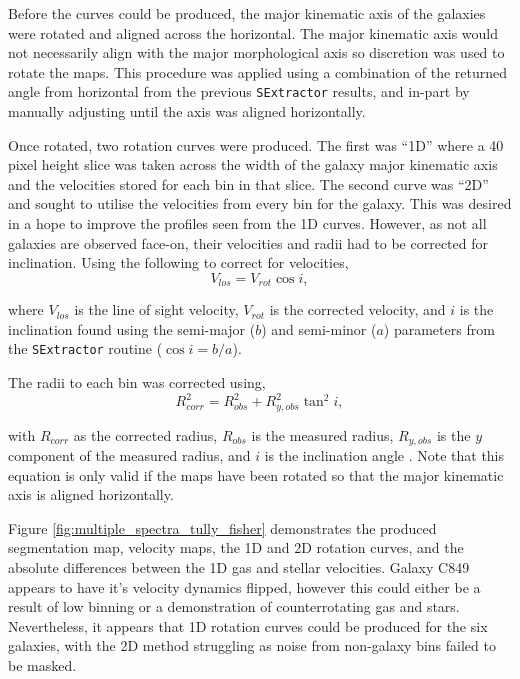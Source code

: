 \documentclass[12pt, twocolumn, nofootinbib]{revtex4-1}    %
\begin{document}
Before the curves could be produced, the major kinematic axis of the galaxies were rotated and aligned across the horizontal. The major kinematic axis would not necessarily align with the major morphological axis so discretion was used to rotate the maps. This procedure was applied using a combination of the returned angle from horizontal from the previous \texttt{SExtractor} results, and in-part by manually adjusting until the axis was aligned horizontally. 

Once rotated, two rotation curves were produced. The first was ``1D'' where a 40 pixel height slice was taken across the width of the galaxy major kinematic axis and the velocities stored for each bin in that slice. The second curve was ``2D'' and sought to utilise the velocities from every bin for the galaxy. This was desired in a hope to improve the profiles seen from the 1D curves. However, as not all galaxies are observed face-on, their velocities and radii had to be corrected for inclination. Using the following to correct for velocities,
\begin{equation}
V_{los} = V_{rot} \cos{i},    
\end{equation}

where $V_{los}$ is the line of sight velocity, $V_{rot}$ is the corrected velocity, and $i$ is the inclination found using the semi-major ($b$) and semi-minor ($a$) parameters from the \texttt{SExtractor} routine ($\cos{i}=b/a$). 

The radii to each bin was corrected using,
\begin{equation}
    R_{corr}^2 = R_{obs}^2 + R^2_{y,obs} \tan^2{i},
\end{equation}

with $R_{corr}$ as the corrected radius, $R_{obs}$ is the measured radius, $R_{y,obs}$ is the $y$ component of the measured radius, and $i$ is the inclination angle \citep{2017_helen}. Note that this equation is only valid if the maps have been rotated so that the major kinematic axis is aligned horizontally.

Figure \ref{fig:multiple_spectra_tully_fisher} demonstrates the produced segmentation map, velocity maps, the 1D and 2D rotation curves, and the absolute differences between the 1D gas and stellar velocities. Galaxy C849 appears to have it's velocity dynamics flipped, however this could either be a result of low binning or a demonstration of counterrotating gas and stars. Nevertheless, it appears that 1D rotation curves could be produced for the six galaxies, with the 2D method struggling as noise from non-galaxy bins failed to be masked. 
\end{document}
